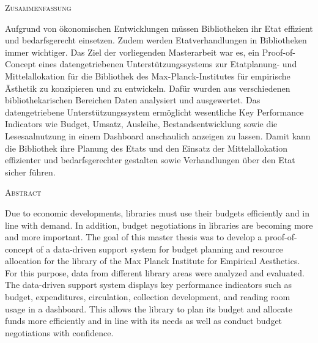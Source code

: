 \begin{center}
    \textsc{Zusammenfassung}
  \end{center}
  \noindent
Aufgrund von ökonomischen Entwicklungen müssen Bibliotheken ihr Etat effizient und bedarfsgerecht einsetzen. 
Zudem werden Etatverhandlungen in Bibliotheken immer wichtiger. 
Das Ziel der vorliegenden Masterarbeit war es, ein Proof-of-Concept eines datengetriebenen Unterstützungssystems zur
Etatplanung- und Mittelallokation für die Bibliothek des Max-Planck-Institutes für empirische Ästhetik zu konzipieren und zu entwickeln.
Dafür wurden aus verschiedenen bibliothekarischen Bereichen Daten analysiert 
und ausgewertet. Das datengetriebene Unterstützungssystem ermöglicht wesentliche Key Performance Indicators wie Budget, 
Umsatz, Ausleihe, Bestandsentwicklung sowie die Lesesaalnutzung in einem Dashboard anschaulich anzeigen zu lassen. 
Damit kann die Bibliothek ihre Planung des Etats und den Einsatz der Mittelallokation effizienter und bedarfsgerechter gestalten
sowie Verhandlungen über den Etat sicher führen.

  

\begin{center}
  \textsc{Abstract}
  \end{center}

  \noindent
  Due to economic developments, libraries must use their budgets efficiently and in line with demand. 
  In addition, budget negotiations in libraries are becoming more and more important. 
  The goal of this master thesis was to develop a proof-of-concept of a data-driven support system for
  budget planning and resource allocation for the library of the Max Planck Institute for Empirical Aesthetics.
  For this purpose, data from different library areas were analyzed and evaluated. The data-driven support system 
  displays key performance indicators such as budget, expenditures, circulation, collection development, and reading room usage in a dashboard. 
  This allows the library to plan its budget and allocate funds more efficiently and in line with its needs
  as well as conduct budget negotiations with confidence.
